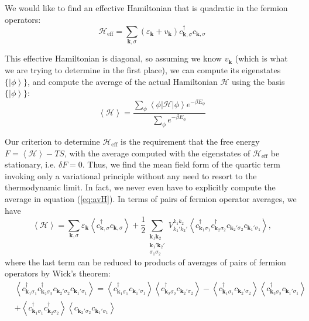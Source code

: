 We would like to find an effective Hamiltonian that is quadratic in the fermion operators:
\begin{equation}\label{eq:mfAv}
\mathcal{H}_{\text{eff}} = \sum_{\bm k, \sigma} (\varepsilon_{\bm k} + v_{\bm k} ) c_{\bm k, \sigma}^\dagger c_{\bm k, \sigma}
\end{equation}

This effective Hamiltonian is diagonal, so assuming we know $v_{\bm k}$ (which is what we are trying to determine in the first place), we can compute its eigenstates $\{ \left| \phi \right\rangle \}$, and compute the average of the actual Hamiltonian $\mathcal{H}$ using the basis $\{ \left| \phi \right\rangle \}$:
\begin{equation}\label{eq:avH}
\left\langle \mathcal{H} \right\rangle = \frac{\sum_\phi \left\langle \phi | \mathcal{H} | \phi \right\rangle e^{-\beta E_\phi} }{\sum_\phi e^{-\beta E_\phi} }
\end{equation}

Our criterion to determine $\mathcal{H}_{\text{eff}}$ is the requirement that the free energy $F = \left\langle \mathcal{H} \right\rangle - TS$, with the average computed with the eigenstates of $\mathcal{H}_{\text{eff}}$ be stationary, i.e. $\delta F = 0$. Thus, we find the mean field form of the quartic term invoking only a variational principle without any need to resort to the thermodynamic limit. In fact, we never even have to explicitly compute the average in equation (\ref{eq:avH}). In terms of pairs of fermion operator averages, we have 
\begin{equation}
\left\langle \mathcal{H} \right\rangle = \sum_{\bm k, \sigma} \varepsilon_{\bm k} \left\langle c_{\bm k, \sigma}^\dagger c_{\bm k, \sigma} \right\rangle + \frac{1}{2} \sum_{\substack{\bm k_1 \bm k_2 \\ \bm k_1' \bm k_2' \\  \sigma_1 \sigma_2}} V_{k_1' k_2'}^{k_1 k_2} \left\langle c_{\bm k_1 \sigma_1}^\dagger c_{\bm k_2 \sigma_2}^\dagger c_{\bm k_2' \sigma_2} c_{\bm k_1' \sigma_1} \right\rangle ,
\end{equation}
where the last term can be reduced to products of averages of pairs of fermion operators by Wick's theorem:
\begin{equation}
\begin{split}
&\left\langle c_{\bm k_1 \sigma_1}^\dagger c_{\bm k_2 \sigma_2}^\dagger c_{\bm k_2' \sigma_2} c_{\bm k_1' \sigma_1} \right\rangle = \left\langle c_{\bm k_1 \sigma_1}^\dagger c_{\bm k_1' \sigma_1} \right\rangle  \left\langle c_{\bm k_2 \sigma_2}^\dagger c_{\bm k_2' \sigma_2} \right\rangle - \left\langle c_{\bm k_1 \sigma_1}^\dagger c_{\bm k_2' \sigma_2} \right\rangle  \left\langle c_{\bm k_2 \sigma_2}^\dagger c_{\bm k_1' \sigma_1} \right\rangle \\
& + \left\langle c_{\bm k_1 \sigma_1}^\dagger c_{\bm k_2 \sigma_2}^\dagger \right\rangle \left\langle c_{\bm k_2' \sigma_2} c_{\bm k_1' \sigma_1} \right\rangle
\end{split}
\end{equation}

